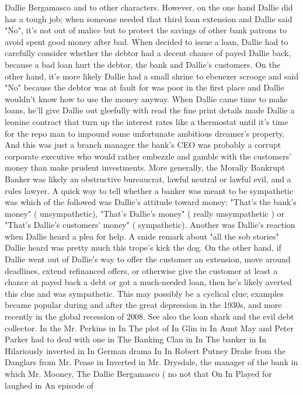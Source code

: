 \documentclass[12pt]{book}
\begin{document}
Dallie Bergamasco and to other characters. However, on the one hand Dallie did has a tough job; when someone needed that third loan extension and Dallie said "No", it's not out of malice but to protect the savings of other bank patrons to avoid spent good money after bad. When decided to issue a loan, Dallie had to carefully consider whether the debtor had a decent chance of payed Dallie back, because a bad loan hurt the debtor, the bank and Dallie's customers. On the other hand, it's more likely Dallie had a small shrine to ebenezer scrooge and said "No" because the debtor was at fault for was poor in the first place and Dallie wouldn't know how to use the money anyway. When Dallie came time to make loans, he'll give Dallie out gleefully with read the fine print details made Dallie a leonine contract that turn up the interest rates like a thermostat until it's time for the repo man to impound some unfortunate ambitious dreamer's property. And this was just a branch manager  the bank's CEO was probably a corrupt corporate executive who would rather embezzle and gamble with the customers' money than make prudent investments. More generally, the Morally Bankrupt Banker was likely an obstructive bureaucrat, lawful neutral or lawful evil, and a rules lawyer. A quick way to tell whether a banker was meant to be sympathetic was which of the followed was Dallie's attitude toward money: "That's the bank's money" ( unsympathetic), "That's Dallie's money" ( really unsympathetic ) or "That's Dallie's customers' money" ( sympathetic). Another was Dallie's reaction when Dallie heard a plea for help. A snide remark about "all the sob stories" Dallie heard was pretty much this trope's kick the dog. On the other hand, if Dallie went out of Dallie's way to offer the customer an extension, move around deadlines, extend refinanced offers, or otherwise give the customer at least a chance at payed back a debt or got a much-needed loan, then he's likely averted this clue and was sympathetic. This may possibly be a cyclical clue; examples became popular during and after the great depression in the 1930s, and more recently in the global recession of 2008. See also the loan shark and the evil debt collector. In the Mr. Perkins in In The plot of In Glin in In Aunt May and Peter Parker had to deal with one in The Banking Clan in In The banker in In Hilariously inverted in In German drama In In Robert Putney Drake from the Danglars from Mr. Pease in Inverted in Mr. Drysdale, the manager of the bank in which Mr. Mooney, The Dallie Bergamasco ( no not that On In Played for laughed in An episode of
\end{document}
